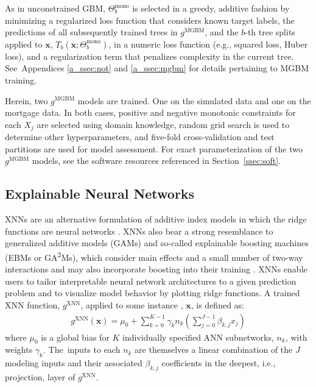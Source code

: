 \documentclass[information,article,accept,moreauthors,pdftex]{Definitions/mdpi}
\begin{document}
 As in unconstrained GBM, $\Theta^{\text{mono}}_b$ is selected in a greedy, additive fashion by minimizing a regularized loss function that considers known target labels, the predictions of all subsequently trained trees in $g^{\text{MGBM}}$, and the $b$-th tree splits applied to $\mathbf{x}$, $T_b(\mathbf{x};\Theta^\text{mono}_b)$, in a numeric loss function (e.g., squared loss, Huber loss), and a regularization term that penalizes complexity in the current tree. See~Appendices \ref{a_ssec:not} and \ref{a_ssec:mgbm} for details pertaining to MGBM training.

Herein, two $g^\text{MGBM}$ models are trained. One on the simulated data and one on the mortgage data. In both cases, positive and negative monotonic constraints for each $X_j$ are selected using domain knowledge, random grid search is used to determine other hyperparameters, and five-fold cross-validation and test partitions are used for model assessment. For exact parameterization of the two $g^\text{MGBM}$ models, see the software resources referenced in Section~\ref{ssec:soft}. 

\subsection{Explainable Neural Networks}\label{ssec:xnn}

XNNs are an alternative formulation of additive index models in which the ridge functions are neural networks \cite{wf_xnn}. XNNs also bear a strong resemblance to generalized additive models (GAMs) and so-called explainable boosting machines (EBMs or GA\textsuperscript{2}Ms), which consider main effects and a small number of two-way interactions and may also incorporate boosting into their training \cite{esl,ga2m}. XNNs enable users to tailor interpretable neural network architectures to a given prediction problem and to visualize model behavior by plotting ridge functions. A trained XNN function, $g^{\text{XNN}}$, applied to some instance , $\mathbf{x}$, is defined as:
\begin{equation}
\begin{aligned}
\label{eq:xnn}
g^{\text{XNN}}(\mathbf{x}) = \mu_0 + \sum_{k=0}^{K-1}\gamma_k n_k(\sum^{J-1}_{j=0}\beta_{k, j}x_j)
\end{aligned}
\end{equation}
where $\mu_0$ is a global bias for $K$ individually specified ANN subnetworks, $n_k$, with weights $\gamma_k$. The~inputs to each $n_k$ are themselves a linear combination of the $J$ modeling inputs and their associated $\beta_{k,j}$ coefficients in the deepest, i.e., {projection}, layer of $g^\text{XNN}$. 
\end{document}
